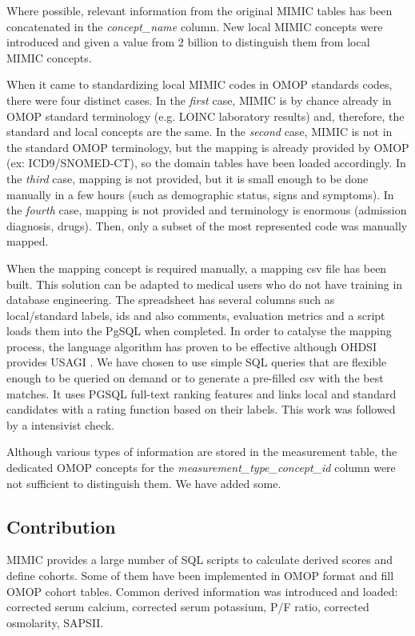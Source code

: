 Where possible, relevant information from the original MIMIC tables has been
concatenated in the \textit{concept\_name} column. New local MIMIC concepts
were introduced and given a value from 2 billion to distinguish them from local
MIMIC concepts.

When it came to standardizing local MIMIC codes in OMOP standards codes, there 
were four distinct cases. In the \emph{first} case, MIMIC is by chance already in 
OMOP standard terminology (e.g. LOINC laboratory results) and, therefore, the standard 
and local concepts are the same. In the \emph{second} case, MIMIC is not in the 
standard OMOP terminology, but the mapping is already provided by OMOP 
(ex: ICD9/SNOMED-CT), so the domain tables have been loaded accordingly. 
In the \emph{third} case, mapping is not provided, but it is small enough to be 
done manually in a few hours (such as demographic status, signs and symptoms). 
In the \emph{fourth} case, mapping is not provided and terminology is enormous 
(admission diagnosis, drugs). Then, only a subset of the most represented code 
was manually mapped.

When the mapping concept is required manually, a mapping csv file has been built. 
This solution can be adapted to medical users who do not have training in 
database engineering. The spreadsheet has several columns such as local/standard 
labels, ids and also comments, evaluation metrics and a script loads them into 
the PgSQL when completed. 
In order to catalyse the mapping process, the language algorithm has proven to 
be effective \cite{schema-matching} although OHDSI provides USAGI \cite{usagi}. We 
have chosen to use simple SQL queries that are flexible enough to be queried on 
demand or to generate a pre-filled csv with the best matches. It uses PGSQL 
full-text ranking features  and links local and standard candidates with a rating 
function based on their labels. This work was followed by a intensivist check.

Although various types of information are stored in the measurement table, the
dedicated OMOP concepts for the \textit{measurement\_type\_concept\_id} column
were not sufficient to distinguish them. We have added some. 

%
%
\subsection{Contribution}

MIMIC provides a large number of SQL scripts to calculate derived scores and 
define cohorts. Some of them have been implemented in OMOP format and fill OMOP 
cohort tables. Common derived information was introduced and loaded: 
corrected serum calcium, corrected serum potassium, P/F ratio, corrected osmolarity, 
SAPSII.

